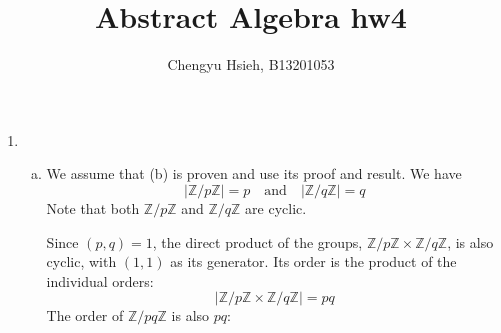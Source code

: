 \documentclass[A4paper,12pt]{article}
\title{Abstract Algebra hw4}
\author{Chengyu Hsieh, B13201053}
\date{}
\theoremstyle{definition}
\numberwithin{equation}{section}
\begin{document}
\maketitle
\begin{enumerate}[1)]
    \item
        \begin{enumerate}[(a)]
            \item
                We assume that (b) is proven and use its proof and result. 
                We have
                $$|\mathbb{Z}/p\mathbb{Z}| = p \quad \text{and} \quad |\mathbb{Z}/q\mathbb{Z}| = q$$
                Note that both $\mathbb{Z}/p\mathbb{Z}$ and $\mathbb{Z}/q\mathbb{Z}$ are cyclic.

                Since $(p, q) = 1$, the direct product of the groups, $\mathbb{Z}/p\mathbb{Z} \times \mathbb{Z}/q\mathbb{Z}$, is also cyclic, with $(1, 1)$ as its generator.
                Its order is the product of the individual orders:
                $$|\mathbb{Z}/p\mathbb{Z} \times \mathbb{Z}/q\mathbb{Z}| = pq$$
                The order of $\mathbb{Z}/pq\mathbb{Z}$ is also $pq$:


\end{enumerate}
\end{enumerate}
\end{document}
